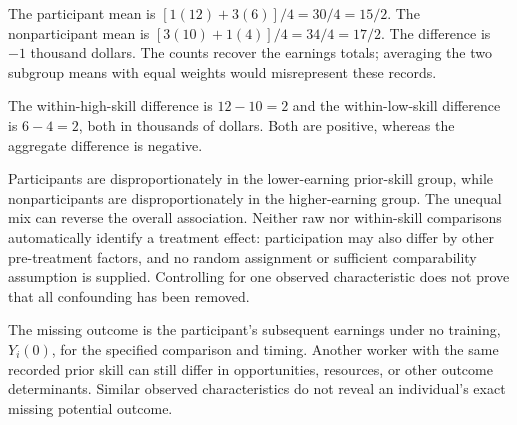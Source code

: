 \documentclass[11pt]{article}
\begin{document}
\begin{parts}
\item The participant mean is $[1(12)+3(6)]/4=30/4=15/2$. The nonparticipant mean is $[3(10)+1(4)]/4=34/4=17/2$. The difference is $-1$ thousand dollars. The counts recover the earnings totals; averaging the two subgroup means with equal weights would misrepresent these records.
\item The within-high-skill difference is $12-10=2$ and the within-low-skill difference is $6-4=2$, both in thousands of dollars. Both are positive, whereas the aggregate difference is negative.
\item Participants are disproportionately in the lower-earning prior-skill group, while nonparticipants are disproportionately in the higher-earning group. The unequal mix can reverse the overall association. Neither raw nor within-skill comparisons automatically identify a treatment effect: participation may also differ by other pre-treatment factors, and no random assignment or sufficient comparability assumption is supplied. Controlling for one observed characteristic does not prove that all confounding has been removed.
\item The missing outcome is the participant's subsequent earnings under no training, $Y_i(0)$, for the specified comparison and timing. Another worker with the same recorded prior skill can still differ in opportunities, resources, or other outcome determinants. Similar observed characteristics do not reveal an individual's exact missing potential outcome.
\end{parts}
\end{document}
